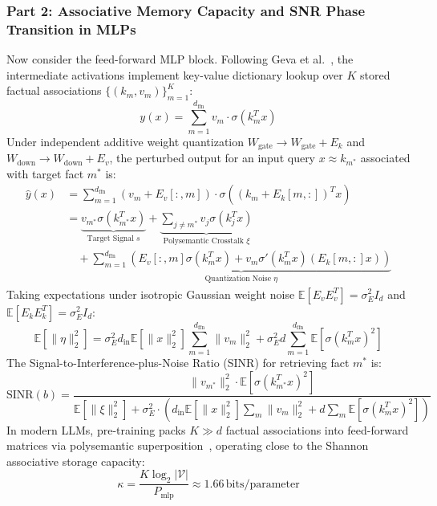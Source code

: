 \documentclass[10pt,twocolumn,letterpaper]{article}
\newcommand{\E}{\mathbb{E}}
\begin{document}
\subsubsection{Part 2: Associative Memory Capacity and SNR Phase Transition in MLPs}
Now consider the feed-forward MLP block. Following Geva et al.~\cite{geva2021transformer}, the intermediate activations implement key-value dictionary lookup over $K$ stored factual associations $\{(k_m, v_m)\}_{m=1}^K$:
\begin{equation}
    y(x) = \sum_{m=1}^{d_{\text{ffn}}} v_m \cdot \sigma(k_m^T x)
\end{equation}
Under independent additive weight quantization $W_{\text{gate}} \to W_{\text{gate}} + E_k$ and $W_{\text{down}} \to W_{\text{down}} + E_v$, the perturbed output for an input query $x \approx k_{m^*}$ associated with target fact $m^*$ is:
\begin{align}
    \widehat{y}(x) &= \sum_{m=1}^{d_{\text{ffn}}} (v_m + E_v[:, m]) \cdot \sigma\left( (k_m + E_k[m, :])^T x \right) \nonumber\\
    &= \underbrace{v_{m^*} \sigma(k_{m^*}^T x)}_{\text{Target Signal } s} + \underbrace{\sum_{j \ne m^*} v_j \sigma(k_j^T x)}_{\text{Polysemantic Crosstalk } \xi} \nonumber\\
    &\quad + \underbrace{\sum_{m=1}^{d_{\text{ffn}}} \left( E_v[:, m] \sigma(k_m^T x) + v_m \sigma'(k_m^T x) (E_k[m, :] x) \right)}_{\text{Quantization Noise } \eta}
\end{align}
Taking expectations under isotropic Gaussian weight noise $\E[E_v E_v^T] = \sigma_E^2 I_d$ and $\E[E_k E_k^T] = \sigma_E^2 I_d$:
\begin{equation}
    \E[\|\eta\|_2^2] = \sigma_E^2 d_{\text{in}} \E[\|x\|_2^2] \sum_{m=1}^{d_{\text{ffn}}} \|v_m\|_2^2 + \sigma_E^2 d \sum_{m=1}^{d_{\text{ffn}}} \E[\sigma(k_m^T x)^2]
\end{equation}
The Signal-to-Interference-plus-Noise Ratio (SINR) for retrieving fact $m^*$ is:
\begin{equation}
    \text{SINR}(b) = \frac{\|v_{m^*}\|_2^2 \cdot \E[\sigma(k_{m^*}^T x)^2]}{\E[\|\xi\|_2^2] + \sigma_E^2 \cdot \left( d_{\text{in}} \E[\|x\|_2^2] \sum_m \|v_m\|_2^2 + d \sum_m \E[\sigma(k_m^T x)^2] \right)}
\end{equation}
In modern LLMs, pre-training packs $K \gg d$ factual associations into feed-forward matrices via polysemantic superposition~\cite{elhage2022superposition}, operating close to the Shannon associative storage capacity:
\begin{equation}
    \kappa = \frac{K \log_2 |\mathcal{V}|}{P_{\text{mlp}}} \approx 1.66\,\text{bits/parameter}
\end{equation}
\end{document}
